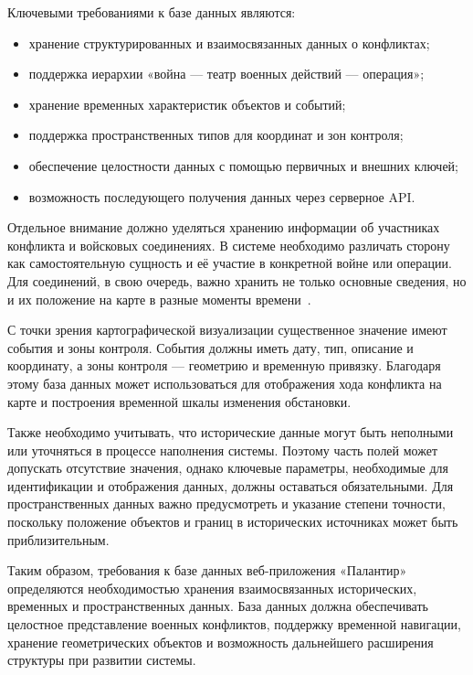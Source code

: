 Ключевыми требованиями к базе данных являются:
\begin{itemize}
    \item хранение структурированных и взаимосвязанных данных о конфликтах;
    \item поддержка иерархии «война --- театр военных действий --- операция»;
    \item хранение временных характеристик объектов и событий;
    \item поддержка пространственных типов для координат и зон контроля;
    \item обеспечение целостности данных с помощью первичных и внешних ключей;
    \item возможность последующего получения данных через серверное API.
\end{itemize}

Отдельное внимание должно уделяться хранению информации об участниках конфликта и войсковых соединениях. В системе необходимо различать сторону как самостоятельную сущность и её участие в конкретной войне или операции. Для соединений, в свою очередь, важно хранить не только основные сведения, но и их положение на карте в разные моменты времени~\cite{silberschatz2019database}.

С точки зрения картографической визуализации существенное значение имеют события и зоны контроля. События должны иметь дату, тип, описание и координату, а зоны контроля --- геометрию и временную привязку. Благодаря этому база данных может использоваться для отображения хода конфликта на карте и построения временной шкалы изменения обстановки.

Также необходимо учитывать, что исторические данные могут быть неполными или уточняться в процессе наполнения системы. Поэтому часть полей может допускать отсутствие значения, однако ключевые параметры, необходимые для идентификации и отображения данных, должны оставаться обязательными. Для пространственных данных важно предусмотреть и указание степени точности, поскольку положение объектов и границ в исторических источниках может быть приблизительным.

Таким образом, требования к базе данных веб-приложения «Палантир» определяются необходимостью хранения взаимосвязанных исторических, временных и пространственных данных. База данных должна обеспечивать целостное представление военных конфликтов, поддержку временной навигации, хранение геометрических объектов и возможность дальнейшего расширения структуры при развитии системы.

